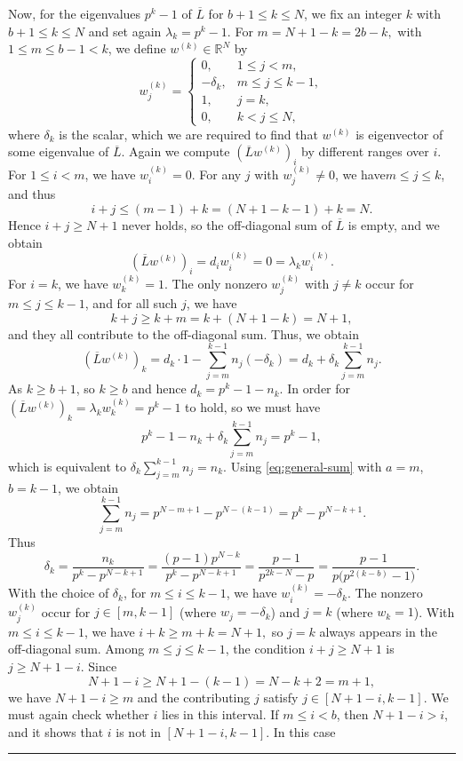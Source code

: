 \documentclass[12pt,twoside]{article}
\renewenvironment{proof}{{\noindent\bfseries Proof.}}{\qed}
\def\qed{\nolinebreak\hfill\rule{.2cm}{.2cm}\par\addvspace{.5cm}}
\begin{document}
\begin{proof}
	Now, for the eigenvalues $p^k-1$ of $\overline{L}$ for $b+1\le k\le N$, we fix an integer $k$ with $b+1\le k\le N$ and set again	$\lambda_k=p^k-1$. For $m = N+1-k = 2b-k,$ with $1\le m\le b-1<k$, we define $w^{(k)}\in\mathbb{R}^N$ by
	\begin{equation}\label{eq:w-k}
		w^{(k)}_j =
		\begin{cases}
			0,          & 1\le j<m,\\
			-\delta_k,  & m\le j\le k-1,\\
			1,          & j=k,\\
			0,          & k<j\le N,
		\end{cases}
	\end{equation}
	where $\delta_k$ is the  scalar, which we are required to find that $w^{(k)}$ is eigenvector of some eigenvalue of $\overline{L}$. Again we compute $(\overline{L}w^{(k)})_i$ by different ranges over $i$. For $1\le i<m$, we have $w^{(k)}_i=0$. For any $j$ with $w^{(k)}_j\ne0$, we have$m\le j\le k$, and thus
	\[
	i+j \le (m-1)+k = (N+1-k-1)+k = N.
	\]
	Hence $i+j\ge N+1$ never holds, so the off-diagonal sum of $\overline{L}$ is empty,  and we obtain
	\[
	(\overline{L}w^{(k)})_i = d_i w^{(k)}_i = 0 = \lambda_k w^{(k)}_i.
	\]
	For $i=k$, we have $w^{(k)}_k=1$. The only nonzero $w^{(k)}_j$ with $j\ne k$ occur
	for $m\le j\le k-1$, and for all such $j$,  we have
	\[
	k+j \ge k+m = k+(N+1-k)=N+1,
	\]
	and they all contribute to the off-diagonal sum. Thus, we obtain
	\[
	(\overline{L}w^{(k)})_k
	= d_k\cdot 1 - \sum_{j=m}^{k-1} n_j(-\delta_k)
	= d_k + \delta_k\sum_{j=m}^{k-1} n_j.
	\]
	As $k\ge b+1$, so $k\ge b$ and hence $d_k=p^k-1-n_k$. In order for $(\overline{L}w^{(k)})_k=\lambda_k w^{(k)}_k=p^k-1$ to hold, so we must have
	\[
	p^k-1-n_k + \delta_k\sum_{j=m}^{k-1}n_j = p^k-1,
	\]
	which is equivalent to $\delta_k\sum_{j=m}^{k-1}n_j = n_k.$
	Using \eqref{eq:general-sum} with $a=m$, $b=k-1$, we obtain
	\[
	\sum_{j=m}^{k-1} n_j
	= p^{N-m+1}-p^{N-(k-1)}
	= p^{k}-p^{N-k+1}.
	\]
	Thus
	\[
	\delta_k
	= \frac{n_k}{p^k-p^{N-k+1}}
	= \frac{(p-1)p^{N-k}}{p^k-p^{N-k+1}}= \frac{p-1}{p^{2k-N}-p}
	= \frac{p-1}{p\bigl(p^{2(k-b)}-1\bigr)}.
	\]
	With the choice of $\delta_k$, for $m\le i\le k-1$, we have  $w^{(k)}_i=-\delta_k$. The nonzero $w^{(k)}_j$ occur for $j\in[m,k-1]$ (where $w_j=-\delta_k$) and $j=k$ (where $w_k=1$). With	$m\le i\le k-1$, we have $i+k \ge m+k = N+1,$	so $j=k$ always appears in the off-diagonal sum. Among $m\le j\le k-1$, the condition $i+j\ge N+1$ is $j\ge N+1-i$. Since
	\[
	N+1-i \ge N+1-(k-1) = N-k+2 = m+1,
	\]
	we have $N+1-i \ge m$ and the contributing $j$ satisfy $j\in [N+1-i,k-1].$ 	We must again check whether $i$ lies in this interval. If $m\le i<b$, then  $N+1-i > i$, and it shows that  $i$ is not in $[N+1-i,k-1]$. In this case

\end{proof}
\end{document}
